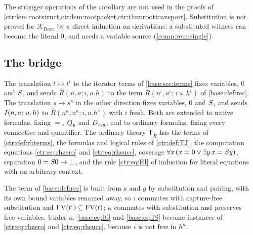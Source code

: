 The stronger operations of the corollary are not used in the proofs of
\cref{ctr:lem:rootstruct,ctr:lem:rootpacket,ctr:thm:roottransport}. Substitution is not proved
for $\mathcal K_{\mathrm{Root}}$ by a direct induction on derivations: a substituted witness can
become the literal $0$, and  needs a variable source (\cref{comp:rem:single}).

\subsection{The bridge}

\begin{definition}\label{ctr:def:rhtrans}
The translation $t\mapsto t^\iota$ to the iterator terms of \cref{base:sec:terms} fixes
variables, $0$ and $S$, and sends $\hat R(n,a;i,u.h)$ to the term
$R(n^\iota,a^\iota;\,i\,u.\,h^\iota)$ of \cref{base:def:rec}. The translation $s\mapsto s^\kappa$
in the other direction fixes variables, $0$ and $S$, and sends $I(n,a;\,u.\,h)$ to
$\hat R(n^\kappa,a^\kappa;i,u.h^\kappa)$ with $i$ fresh. Both are extended to native formulas,
fixing $=$, $Q_{y}$ and $D_{x,y}$, and to ordinary formulas, fixing every connective and
quantifier. The ordinary theory $\mathsf T_{\hat R}$ has the terms of \cref{ctr:def:rhterms}, the
formulas and logical rules of \cref{ctr:def:TJ}, the computation equations
\eqref{ctr:eq:rhzero} and \eqref{ctr:eq:rhsucc}, coverage
$\forall x\,(x=0\lor\exists y\,x=S y)$, separation $0=S 0\to\bot$, and the rule
\eqref{ctr:eq:EI} of induction for literal equations with an arbitrary context.
\end{definition}

The term of \cref{base:def:rec} is built from $a$ and $g$ by substitution and pairing, with its
own bound variables renamed away, so $\iota$ commutes with capture-free substitution and
$\operatorname{FV}(t^\iota)\subseteq\operatorname{FV}(t)$; $\kappa$ commutes with substitution and preserves free variables.
Under $\kappa$, \eqref{base:eq:I0} and \eqref{base:eq:IS} become instances of
\eqref{ctr:eq:rhzero} and \eqref{ctr:eq:rhsucc}, because $i$ is not free in $h^\kappa$.

